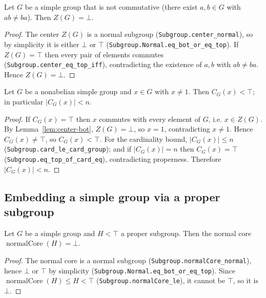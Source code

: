 \begin{lemma}
    \label{lem:center-bot}
    \leanok
    Let $G$ be a simple group that is not commutative (there exist
    $a, b \in G$ with $ab \ne ba$). Then $Z(G) = \bot$.
\end{lemma}
\begin{proof}
    The center $Z(G)$ is a normal subgroup (\texttt{Subgroup.center\_normal}), so
    by simplicity it is either $\bot$ or $\top$
    (\texttt{Subgroup.Normal.eq\_bot\_or\_eq\_top}). If $Z(G) = \top$ then every
    pair of elements commutes (\texttt{Subgroup.center\_eq\_top\_iff}),
    contradicting the existence of $a, b$ with $ab \ne ba$. Hence $Z(G) = \bot$.
\end{proof}

\begin{lemma}
    \label{lem:centralizer-proper}
    \leanok
    Let $G$ be a nonabelian simple group and $x \in G$ with $x \ne 1$. Then
    $C_G(x) < \top$; in particular $|C_G(x)| < n$.
\end{lemma}
\begin{proof}
    If $C_G(x) = \top$ then $x$ commutes with every element of $G$, i.e.
    $x \in Z(G)$. By Lemma~\ref{lem:center-bot}, $Z(G) = \bot$, so $x = 1$,
    contradicting $x \ne 1$. Hence $C_G(x) \ne \top$, so $C_G(x) < \top$. For the
    cardinality bound, $|C_G(x)| \le n$
    (\texttt{Subgroup.card\_le\_card\_group}); and if $|C_G(x)| = n$ then
    $C_G(x) = \top$ (\texttt{Subgroup.eq\_top\_of\_card\_eq}), contradicting
    properness. Therefore $|C_G(x)| < n$.
\end{proof}

\subsection{Embedding a simple group via a proper subgroup}

\begin{lemma}
    \label{lem:normalcore-bot}
    \leanok
    Let $G$ be a simple group and $H < \top$ a proper subgroup. Then the normal
    core $\operatorname{normalCore}(H) = \bot$.
\end{lemma}
\begin{proof}
    The normal core is a normal subgroup
    (\texttt{Subgroup.normalCore\_normal}), hence $\bot$ or $\top$ by simplicity
    (\texttt{Subgroup.Normal.eq\_bot\_or\_eq\_top}). Since
    $\operatorname{normalCore}(H) \le H < \top$
    (\texttt{Subgroup.normalCore\_le}), it cannot be $\top$, so it is $\bot$.
\end{proof}

